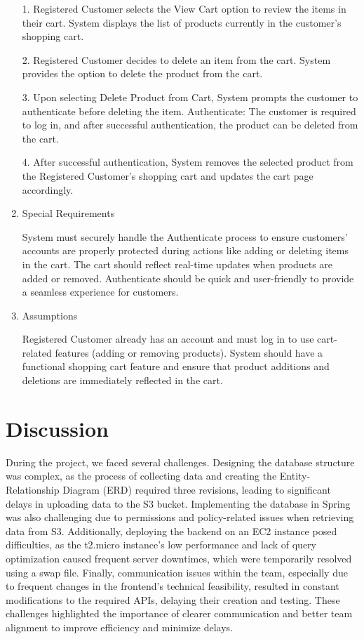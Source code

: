 \documentclass[conference]{IEEEtran}
\begin{document}
\begin{enumerate}
1. Registered Customer selects the View Cart option to review the items in their cart.
System displays the list of products currently in the customer's shopping cart.

2. Registered Customer decides to delete an item from the cart.
System provides the option to delete the product from the cart.

3. Upon selecting Delete Product from Cart, System prompts the customer to authenticate before deleting the item.
Authenticate: The customer is required to log in, and after successful authentication, the product can be deleted from the cart.

4. After successful authentication, System removes the selected product from the Registered Customer's shopping cart and updates the cart page accordingly.
\item Special Requirements

System must securely handle the Authenticate process to ensure customers' accounts are properly protected during actions like adding or deleting items in the cart.
The cart should reflect real-time updates when products are added or removed.
Authenticate should be quick and user-friendly to provide a seamless experience for customers.
\item Assumptions

Registered Customer already has an account and must log in to use cart-related features (adding or removing products).
System should have a functional shopping cart feature and ensure that product additions and deletions are immediately reflected in the cart.

\end{enumerate}

\section{Discussion}
\hspace*{1.2ex}
During the project, we faced several challenges. Designing the database structure was complex, as the process of collecting data and creating the Entity-Relationship Diagram (ERD) required three revisions, leading to significant delays in uploading data to the S3 bucket. Implementing the database in Spring was also challenging due to permissions and policy-related issues when retrieving data from S3. Additionally, deploying the backend on an EC2 instance posed difficulties, as the t2.micro instance's low performance and lack of query optimization caused frequent server downtimes, which were temporarily resolved using a swap file. Finally, communication issues within the team, especially due to frequent changes in the frontend's technical feasibility, resulted in constant modifications to the required APIs, delaying their creation and testing. These challenges highlighted the importance of clearer communication and better team alignment to improve efficiency and minimize delays.
\end{document}
